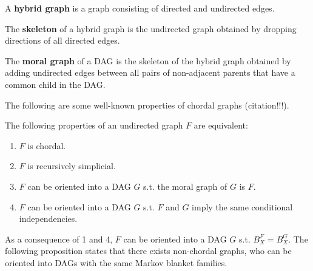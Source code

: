 \begin{definition}
\label{def:hybrid_g}
A \textbf{hybrid graph} is a graph consisting of directed and undirected edges. 
\end{definition}

\begin{definition}
\label{def:skeleton}
The \textbf{skeleton} of a hybrid graph is the undirected graph obtained by dropping directions of all directed edges. 
\end{definition} 

\begin{definition}
\label{def:moral_g}
The \textbf{moral graph} of a DAG is the skeleton of the hybrid graph obtained by adding undirected edges between all pairs of non-adjacent parents that have a common child in the DAG. 
\end{definition}

The following are some well-known properties of chordal graphs (citation!!!).
\begin{proposition}
\label{prop:chordal_properties}
The following properties of an undirected graph $F$ are equivalent:
\begin{enumerate}
\item $F$ is chordal. 
\item $F$ is recursively simplicial. 
\item $F$ can be oriented into a DAG $G$ s.t. the moral graph of $G$ is $F$.
\item $F$ can be oriented into a DAG $G$ s.t. $F$ and $G$ imply the same conditional independencies. 
\end{enumerate}
\end{proposition}
As a consequence of 1 and 4, $F$ can be oriented into a DAG $G$ s.t. $B_X^F = B_X^G$. The following proposition states that there  exists non-chordal graphs, who can be oriented into DAGs with the same Markov blanket families. 

